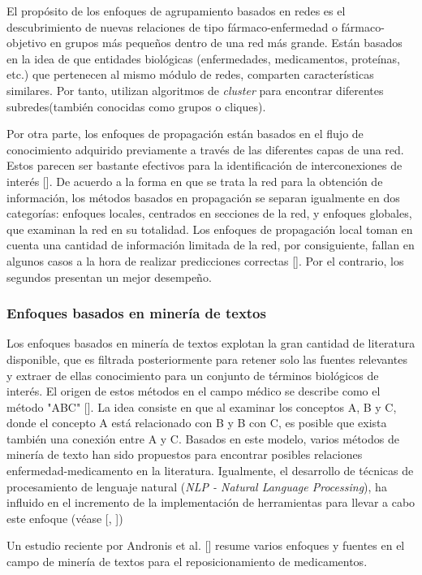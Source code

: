 El propósito de los enfoques de agrupamiento basados en redes es el descubrimiento de nuevas relaciones de tipo fármaco-enfermedad o fármaco-objetivo en grupos más pequeños dentro de una red más grande. Están basados en la idea de que entidades biológicas (enfermedades, medicamentos, proteínas, etc.) que pertenecen al mismo módulo de redes, comparten características similares. Por tanto, utilizan algoritmos de \textit{cluster} para encontrar diferentes subredes(también conocidas como grupos o cliques).

Por otra parte, los enfoques de propagación están basados en el flujo de conocimiento adquirido previamente a través de las diferentes capas de una red. Estos parecen ser bastante efectivos para la identificación de interconexiones de interés [\cite{emig}]. De acuerdo a la forma en que se trata la red para la obtención de información, los métodos basados en propagación se separan igualmente en dos categorías: enfoques locales, centrados en secciones de la red, y enfoques globales, que examinan la red en su totalidad. Los enfoques de propagación local toman en cuenta una cantidad de información limitada de la red, por consiguiente, fallan en algunos casos a la hora de realizar predicciones correctas [\cite{emig}]. Por el contrario, los segundos presentan un mejor desempeño.

\subsubsection{Enfoques basados en minería de textos}
Los enfoques basados en minería de textos explotan la gran cantidad de literatura disponible, que es filtrada posteriormente para retener solo las fuentes relevantes y extraer de ellas conocimiento para un conjunto de términos biológicos de interés. El origen de estos métodos en el campo médico se describe como el método "ABC" [\cite{weeber}]. La idea consiste en que al examinar los conceptos A, B y C, donde el concepto A está relacionado con B y B con C, es posible que exista también una conexión entre A y C. Basados en este modelo, varios métodos de minería de texto han sido propuestos para encontrar posibles relaciones enfermedad-medicamento en la literatura. Igualmente, el desarrollo de técnicas de procesamiento de lenguaje natural (\textit{NLP - Natural Language Processing}), ha influido en el incremento de la implementación de herramientas para llevar a cabo este enfoque (véase [\cite{miningapps1}, \cite{miningapps2}])

Un estudio reciente por Andronis et al. [\cite{mining}] resume varios enfoques y fuentes en el campo de minería de textos para el reposicionamiento de medicamentos.

